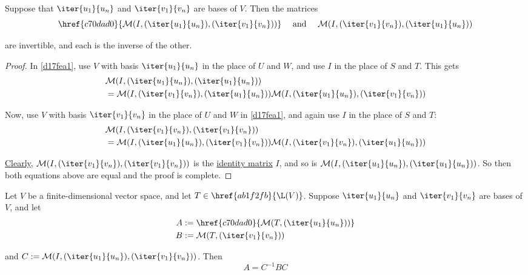 \label{f0a32c6}

Suppose that $\iter{u_1}{u_n}$ and $\iter{v_1}{v_n}$ are bases of $V$. Then the
matrices
$$
  \href{c70dad0}{\mathcal M(I,(\iter{u_1}{u_n}),(\iter{v_1}{v_n}))}
  \quad\text{ and }\quad
  \mathcal M(I,(\iter{v_1}{v_n}),(\iter{u_1}{u_n}))
$$

are invertible, and each is the inverse of the other.

\begin{proof}
  In \autoref{d17fea1}, use $V$ with basis $\iter{u_1}{u_n}$ in the place of $U$
  and $W$, and use $I$ in the place of $S$ and $T$. This gets
  \begin{align*}
     &\mathcal M(I,(\iter{u_1}{u_n}),(\iter{u_1}{u_n}))  \\
     &=\mathcal M(I,(\iter{v_1}{v_n}),(\iter{u_1}{u_n}))
    \mathcal M(I,(\iter{u_1}{u_n}),(\iter{v_1}{v_n}))
  \end{align*}

  Now, use $V$ with basis $\iter{v_1}{v_n}$ in the place of $U$ and $W$ in
  \autoref{d17fea1}, and again use $I$ in the place of $S$ and $T$:
  \begin{align*}
     &\mathcal M(I,(\iter{v_1}{v_n}),(\iter{v_1}{v_n}))  \\
     &=\mathcal M(I,(\iter{u_1}{u_n}),(\iter{v_1}{v_n}))
    \mathcal M(I,(\iter{v_1}{v_n}),(\iter{u_1}{u_n}))
  \end{align*}

  \href{a43a301}{Clearly}, $\mathcal M(I,(\iter{v_1}{v_n}),(\iter{v_1}{v_n}))$
  is the \href{dcfd9cd}{identity matrix} $I$, and so is $\mathcal
  M(I,(\iter{u_1}{u_n}),(\iter{u_1}{u_n}))$. So then both equations above are
  equal and the proof is complete.
\end{proof}

\label{ded76d1}

Let $V$ be a finite-dimensional vector space, and let
$T\in\href{ab1f2fb}{\L(V)}$. Suppose $\iter{u_1}{u_n}$ and $\iter{v_1}{v_n}$
are bases of $V$, and let
\begin{align*}
  A &:=\href{c70dad0}{\mathcal M(T,(\iter{u_1}{u_n}))} \\
  B &:=\mathcal M(T,(\iter{v_1}{v_n}))
\end{align*}

and $C:=\mathcal M(I,(\iter{u_1}{u_n}),(\iter{v_1}{v_n}))$. Then
$$
  A=C^{-1}BC
$$

